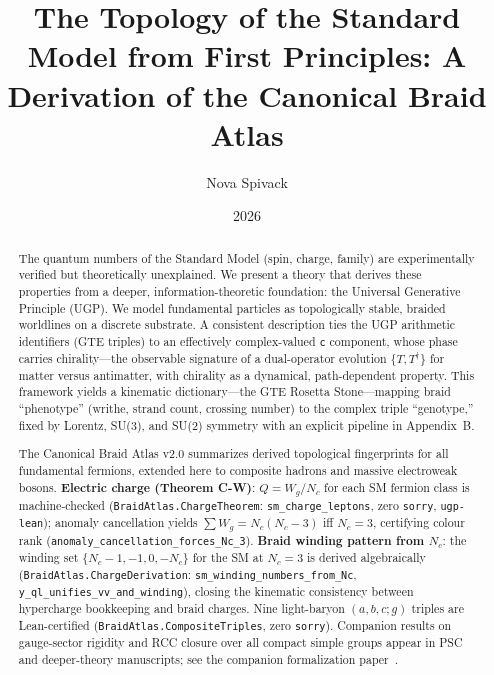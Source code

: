 \documentclass[11pt]{article}
\title{\bfseries The Topology of the Standard Model from First Principles: A Derivation of the Canonical Braid Atlas}
\author[1]{Nova Spivack}
\date{2026}
\theoremstyle{remark}
\begin{document}
\maketitle
\NovaZenodoAfterTitle

\begin{abstract}
The quantum numbers of the Standard Model (spin, charge, family) are experimentally verified but theoretically unexplained. We present a theory that derives these properties from a deeper, information-theoretic foundation: the Universal Generative Principle (UGP). We model fundamental particles as topologically stable, braided worldlines on a discrete substrate. A consistent description ties the UGP arithmetic identifiers (GTE triples) to an effectively complex-valued \texttt{c} component, whose phase carries chirality---the observable signature of a dual-operator evolution $\{T, T^\dagger\}$ for matter versus antimatter, with chirality as a dynamical, path-dependent property. This framework yields a kinematic dictionary---the GTE Rosetta Stone---mapping braid ``phenotype'' (writhe, strand count, crossing number) to the complex triple ``genotype,'' fixed by Lorentz, SU(3), and SU(2) symmetry with an explicit pipeline in Appendix~B.

The Canonical Braid Atlas v2.0 summarizes derived topological fingerprints for all fundamental fermions, extended here to composite hadrons and massive electroweak bosons. \textbf{Electric charge (Theorem C-W)}: $Q = W_g/N_c$ for each SM fermion class is machine-checked (\texttt{BraidAtlas.ChargeTheorem}: \texttt{sm\_charge\_leptons}, zero \texttt{sorry}, \texttt{ugp-lean}); anomaly cancellation yields $\sum W_g = N_c(N_c{-}3)$ iff $N_c{=}3$, certifying colour rank (\texttt{anomaly\_cancellation\_forces\_Nc\_3}). \textbf{Braid winding pattern from $N_c$}: the winding set $\{N_c{-}1,{-}1,0,{-}N_c\}$ for the SM at $N_c{=}3$ is derived algebraically (\texttt{BraidAtlas.ChargeDerivation}: \texttt{sm\_winding\_numbers\_from\_Nc}, \texttt{y\_ql\_unifies\_vv\_and\_winding}), closing the kinematic consistency between hypercharge bookkeeping and braid charges. Nine light-baryon $(a,b,c;g)$ triples are Lean-certified (\texttt{BraidAtlas.CompositeTriples}, zero \texttt{sorry}). Companion results on gauge-sector rigidity and RCC closure over all compact simple groups appear in PSC and deeper-theory manuscripts; see the companion formalization paper~\cite{SpivackUGPFormalization}.
\end{abstract}

\tableofcontents
\newpage
\end{document}
